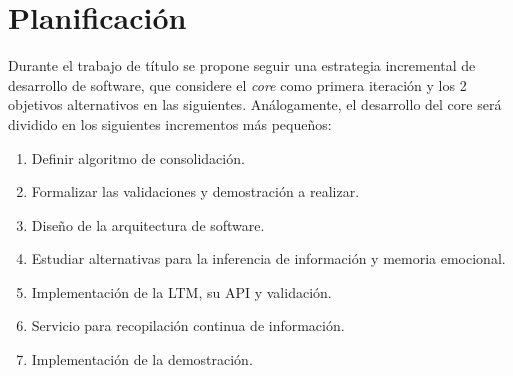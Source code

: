 

\section{Planificaci\'on}

Durante el trabajo de t\'itulo se propone seguir una estrategia incremental de desarrollo de software, que considere el \textit{core} como primera iteraci\'on y los 2 objetivos alternativos en las siguientes. An\'alogamente, el desarrollo del core ser\'a dividido en los siguientes incrementos m\'as peque\~nos:

\begin{enumerate}
\item Definir algoritmo de consolidaci\'on.
\item Formalizar las validaciones y demostraci\'on a realizar.
\item Dise\~no de la arquitectura de software.
\item Estudiar alternativas para la inferencia de informaci\'on y memoria emocional.
\item Implementaci\'on de la LTM, su API y validaci\'on.
\item Servicio para recopilaci\'on continua de informaci\'on.
\item Implementaci\'on de la demostraci\'on.
\end{enumerate}

 

